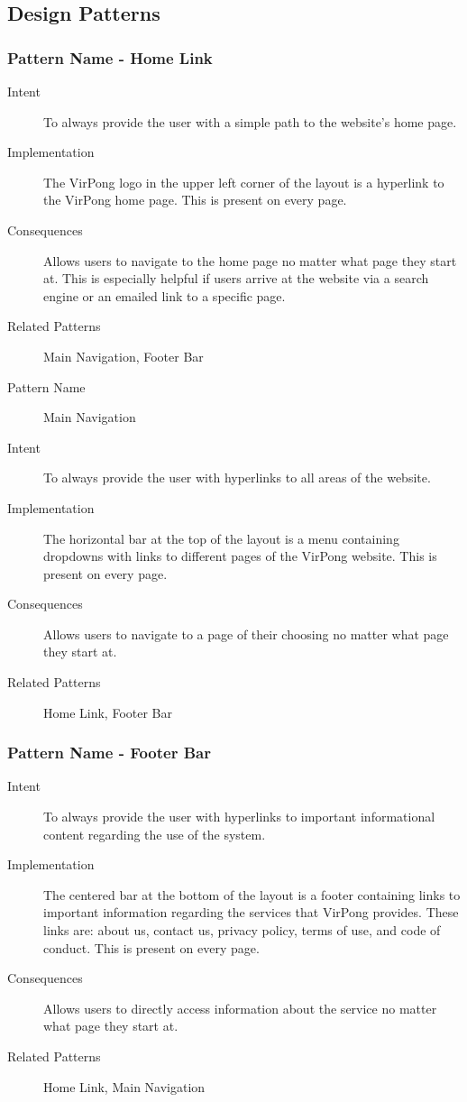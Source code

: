 %

	\subsection{Design Patterns}
	
		\subsubsection{Pattern Name - Home Link}
			\begin{description}
				\item[Intent] To always provide the user with a simple path to the website's home page.
				\item[Implementation] The VirPong logo in the upper left corner of the layout is a hyperlink to the VirPong home page. This is present on every page.
				\item[Consequences] Allows users to navigate to the home page no matter what page they start at. This is especially helpful if users arrive at the website via a search engine or an emailed link to a specific page.
				\item[Related Patterns] Main Navigation, Footer Bar
				\item[Pattern Name] Main Navigation
				\item[Intent] To always provide the user with hyperlinks to all areas of the website.
				\item[Implementation] The horizontal bar at the top of the layout is a menu containing dropdowns with links to different pages of the VirPong website. This is present on every page.
				\item[Consequences] Allows users to navigate to a page of their choosing no matter what page they start at.
				\item[Related Patterns] Home Link, Footer Bar
			\end{description}
			
		\subsubsection{Pattern Name - Footer Bar}
			\begin{description}
				\item[Intent] To always provide the user with hyperlinks to important informational content regarding the use of the system.
				\item[Implementation] The centered bar at the bottom of the layout is a footer containing links to important information regarding the services that VirPong provides. These links are: about us, contact us, privacy policy, terms of use, and code of conduct. This is present on every page.
				\item[Consequences] Allows users to directly access information about the service no matter what page they start at.
				\item[Related Patterns] Home Link, Main Navigation
			\end{description}
			
